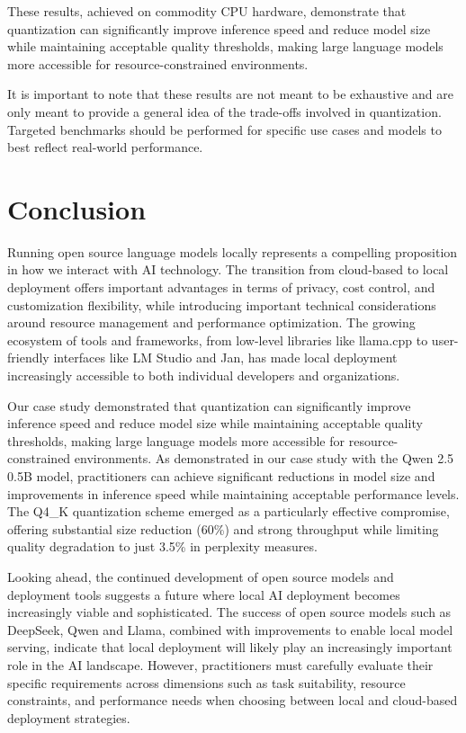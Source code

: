These results, achieved on commodity CPU hardware, demonstrate that quantization can significantly improve inference speed and reduce model size while maintaining acceptable quality thresholds, making large language models more accessible for resource-constrained environments.

It is important to note that these results are not meant to be exhaustive and are only meant to provide a general idea of the trade-offs involved in quantization. Targeted benchmarks should be performed for specific use cases and models to best reflect real-world performance.

\section{Conclusion}

Running open source language models locally represents a compelling proposition in how we interact with AI technology. The transition from cloud-based to local deployment offers important advantages in terms of privacy, cost control, and customization flexibility, while introducing important technical considerations around resource management and performance optimization. The growing ecosystem of tools and frameworks, from low-level libraries like llama.cpp to user-friendly interfaces like LM Studio and Jan, has made local deployment increasingly accessible to both individual developers and organizations.

Our case study demonstrated that quantization can significantly improve inference speed and reduce model size while maintaining acceptable quality thresholds, making large language models more accessible for resource-constrained environments. As demonstrated in our case study with the Qwen 2.5 0.5B model, practitioners can achieve significant reductions in model size and improvements in inference speed while maintaining acceptable performance levels. The Q4\_K quantization scheme emerged as a particularly effective compromise, offering substantial size reduction (60\%) and strong throughput while limiting quality degradation to just 3.5\% in perplexity measures.

Looking ahead, the continued development of open source models and deployment tools suggests a future where local AI deployment becomes increasingly viable and sophisticated. The success of open source models such as DeepSeek, Qwen and Llama, combined with improvements to enable local model serving, indicate that local deployment will likely play an increasingly important role in the AI landscape. However, practitioners must carefully evaluate their specific requirements across dimensions such as task suitability, resource constraints, and performance needs when choosing between local and cloud-based deployment strategies.

